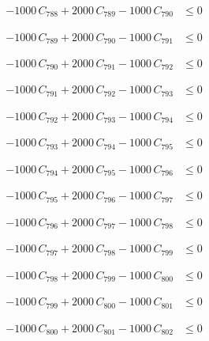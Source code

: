 \documentclass[a4paper,11pt]{article}
\begin{document}
\begin{align}
-1000\,C_{788} + 2000\,C_{789} - 1000\,C_{790} &\leq 0 \nonumber
\end{align}

\begin{align}
-1000\,C_{789} + 2000\,C_{790} - 1000\,C_{791} &\leq 0 \nonumber
\end{align}

\begin{align}
-1000\,C_{790} + 2000\,C_{791} - 1000\,C_{792} &\leq 0 \nonumber
\end{align}

\begin{align}
-1000\,C_{791} + 2000\,C_{792} - 1000\,C_{793} &\leq 0 \nonumber
\end{align}

\begin{align}
-1000\,C_{792} + 2000\,C_{793} - 1000\,C_{794} &\leq 0 \nonumber
\end{align}

\begin{align}
-1000\,C_{793} + 2000\,C_{794} - 1000\,C_{795} &\leq 0 \nonumber
\end{align}

\begin{align}
-1000\,C_{794} + 2000\,C_{795} - 1000\,C_{796} &\leq 0 \nonumber
\end{align}

\begin{align}
-1000\,C_{795} + 2000\,C_{796} - 1000\,C_{797} &\leq 0 \nonumber
\end{align}

\begin{align}
-1000\,C_{796} + 2000\,C_{797} - 1000\,C_{798} &\leq 0 \nonumber
\end{align}

\begin{align}
-1000\,C_{797} + 2000\,C_{798} - 1000\,C_{799} &\leq 0 \nonumber
\end{align}

\begin{align}
-1000\,C_{798} + 2000\,C_{799} - 1000\,C_{800} &\leq 0 \nonumber
\end{align}

\begin{align}
-1000\,C_{799} + 2000\,C_{800} - 1000\,C_{801} &\leq 0 \nonumber
\end{align}

\begin{align}
-1000\,C_{800} + 2000\,C_{801} - 1000\,C_{802} &\leq 0 \nonumber
\end{align}
\end{document}
